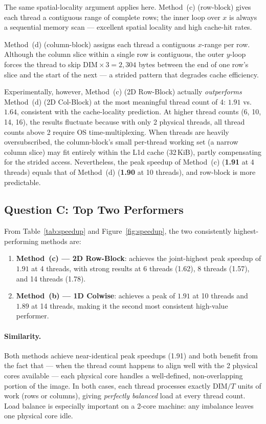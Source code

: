 The same spatial-locality argument applies here.
Method~(c) (row-block) gives each thread a contiguous range of complete rows; the
inner loop over $x$ is always a sequential memory scan — excellent spatial locality
and high cache-hit rates.

Method~(d) (column-block) assigns each thread a contiguous $x$-range per row.
Although the column slice within a single row is contiguous, the outer $y$-loop forces
the thread to skip $\text{DIM} \times 3 = 2{,}304$ bytes between the end of one row's
slice and the start of the next — a strided pattern that degrades cache efficiency.

Experimentally, however, Method~(c) (2D Row-Block) actually \emph{outperforms}
Method~(d) (2D Col-Block) at the most meaningful thread count of 4: $\mathbf{1.91}$
vs.\ $\mathbf{1.64}$, consistent with the cache-locality prediction.
At higher thread counts (6, 10, 14, 16), the results fluctuate because with only 2
physical threads, all thread counts above 2 require OS time-multiplexing.
When threads are heavily oversubscribed, the column-block's small per-thread working
set (a narrow column slice) may fit entirely within the L1d cache (32\,KiB), partly
compensating for the strided access.
Nevertheless, the peak speedup of Method~(c) (\textbf{1.91} at 4 threads) equals that
of Method~(d) (\textbf{1.90} at 10 threads), and row-block is more predictable.

\subsection{Question C: Top Two Performers}

From Table~\ref{tab:speedup} and Figure~\ref{fig:speedup}, the two consistently
highest-performing methods are:

\begin{enumerate}
  \item \textbf{Method~(c) — 2D Row-Block}: achieves the joint-highest peak speedup
        of $\mathbf{1.91}$ at 4 threads, with strong results at 6 threads (1.62),
        8 threads (1.57), and 14 threads (1.78).
  \item \textbf{Method~(b) — 1D Colwise}: achieves a peak of $\mathbf{1.91}$ at
        10 threads and $1.89$ at 14 threads, making it the second most consistent
        high-value performer.
\end{enumerate}

\paragraph{Similarity.}
Both methods achieve near-identical peak speedups (1.91) and both benefit from the
fact that — when the thread count happens to align well with the 2 physical cores
available — each physical core handles a well-defined, non-overlapping portion of the
image.
In both cases, each thread processes exactly $\text{DIM}/T$ units of work
(rows or columns), giving \emph{perfectly balanced} load at every thread count.
Load balance is especially important on a 2-core machine: any imbalance leaves one
physical core idle.

